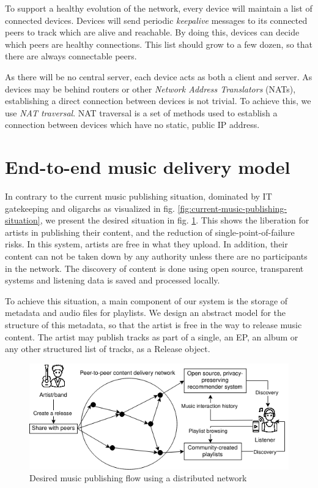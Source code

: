 To support a healthy evolution of the network, every device will maintain a list of connected devices. Devices will send periodic \textit{keepalive} messages to its connected peers to track which are alive and reachable. By doing this, devices can decide which peers are healthy connections. This list should grow to a few dozen, so that there are always connectable peers.

As there will be no central server, each device acts as both a client and server. As devices may be behind routers or other \textit{Network Address Translators} (NATs), establishing a direct connection between devices is not trivial. To achieve this, we use \textit{NAT traversal}. NAT traversal is a set of methods used to establish a connection between devices which have no static, public IP address.

\section{End-to-end music delivery model}
\label{sec:release-model}
In contrary to the current music publishing situation, dominated by IT gatekeeping and oligarchs as visualized in fig. \ref{fig:current-music-publishing-situation}, we present the desired situation in fig. \ref{fig:desired-music-publishing-situation}. This shows the liberation for artists in publishing their content, and the reduction of single-point-of-failure risks. In this system, artists are free in what they upload. In addition, their content can not be taken down by any authority unless there are no participants in the network. The discovery of content is done using open source, transparent systems and listening data is saved and processed locally.

To achieve this situation, a main component of our system is the storage of metadata and audio files for playlists. We design an abstract model for the structure of this metadata, so that the artist is free in the way to release music content. The artist may publish tracks as part of a single, an EP, an album or any other structured list of tracks, as a Release object.

\begin{figure}
    \centering
    \includegraphics[width=0.8\linewidth]{design/desired-music-publishing-situation-2.png}
    \caption{Desired music publishing flow using a distributed network}
    \label{fig:desired-music-publishing-situation}
\end{figure}

